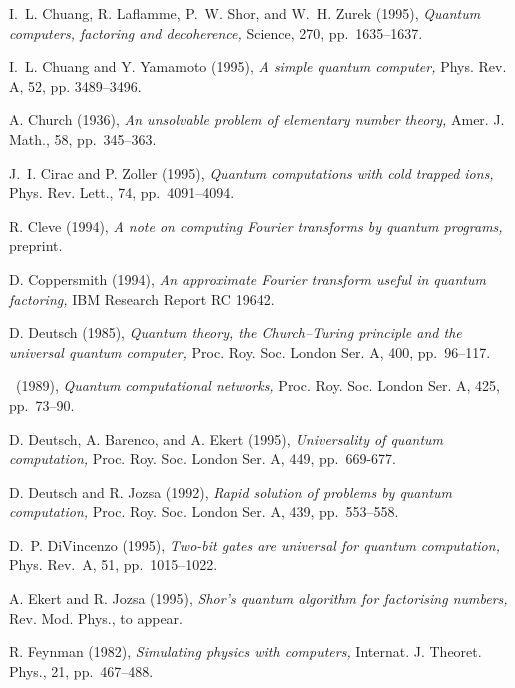 {\begin{thebibliography}{}
  {\sc I.~L. Chuang, R. Laflamme,
P.~W. Shor, and W.~H. Zurek} (1995),
{\em Quantum computers, factoring and decoherence,} Science, 270, 
pp.~1635--1637.

  {\sc I.~L. Chuang and Y. Yamamoto}
(1995), {\em A simple quantum computer,} Phys. Rev. A, {52}, pp. 3489--3496.

  {\sc A. Church} (1936), {\em An unsolvable 
problem of elementary number theory,} {Amer. J. Math.,} {58,} pp.~345--363.

  {\sc J.~I. Cirac and P. Zoller} 
(1995), {\em Quantum computations with cold trapped ions,} {Phys. Rev. 
Lett.,} {74,} pp.~4091--4094.

  {\sc R. Cleve} (1994), {\em A note on computing 
Fourier transforms by quantum programs,} preprint.

  {\sc D. Coppersmith} (1994), {\em An 
approximate Fourier transform useful in quantum factoring,} {IBM Research 
Report RC 19642}.

  {\sc D. Deutsch} (1985), {\em Quantum 
theory, the Church--Turing principle and the universal quantum computer,} 
{Proc. Roy. Soc. London Ser. A,} {400,} pp.~96--117.

  \sameauthor\  (1989), {\em Quantum 
computational networks,} {Proc. Roy. Soc. London Ser. A,} {425,} pp.~73--90.

  {\sc D. Deutsch, A. Barenco, and
A. Ekert} (1995), {\em Universality of quantum computation,} Proc. Roy.
Soc. London Ser. A, 449, pp.~669-677.

  {\sc D. Deutsch and R. Jozsa} 
(1992), {\em Rapid solution of problems by quantum computation,} 
{Proc. Roy. Soc. London Ser. A,} {439,} pp.~553--558.

  {\sc D.~P. DiVincenzo} (1995), {\em Two-bit 
gates are universal for quantum computation,} {Phys. Rev.~A,} {51,} 
pp.~1015--1022.

  {\sc A. Ekert and R. Jozsa} (1995), 
{\em Shor's quantum algorithm for factorising numbers,} {Rev. Mod. Phys.,} 
to appear.

  {\sc R. Feynman} (1982), {\em Simulating 
physics with computers,} {Internat. J. Theoret. Phys.,} {21,} 
pp.~467--488.


\end{thebibliography}}
